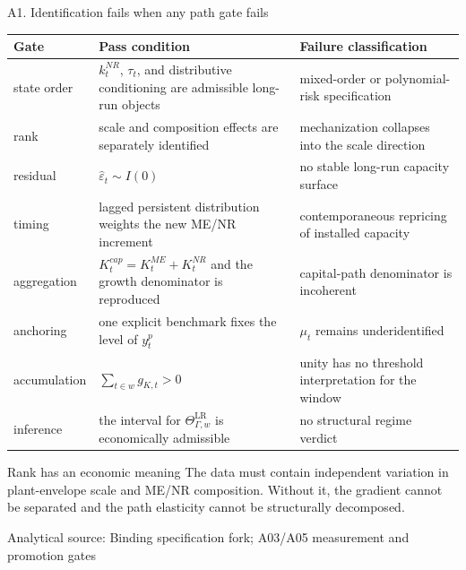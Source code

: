 \documentclass[10pt,aspectratio=169]{beamer}
\newcommand{\LR}{\mathrm{LR}}
\newcommand{\sourcefooter}[1]{%
  \par\vfill{\tiny\color{gray!70}Analytical source: #1}\vspace{-0.35em}}
\begin{document}
\begin{frame}{A1. Identification fails when any path gate fails}
  \scriptsize
  \renewcommand{\arraystretch}{1.28}
  \begin{tabular}{@{}L{0.17\textwidth}L{0.40\textwidth}L{0.35\textwidth}@{}}
    \toprule
    \textbf{Gate} & \textbf{Pass condition} & \textbf{Failure classification} \\
    \midrule
    state order & $k_t^{NR}$, $\tau_t$, and distributive conditioning are admissible long-run objects & mixed-order or polynomial-risk specification \\
    rank & scale and composition effects are separately identified & mechanization collapses into the scale direction \\
    residual & $\widehat\varepsilon_t\sim I(0)$ & no stable long-run capacity surface \\
    timing & lagged persistent distribution weights the new ME/NR increment & contemporaneous repricing of installed capacity \\
    aggregation & $K_t^{cap}=K_t^{ME}+K_t^{NR}$ and the growth denominator is reproduced & capital-path denominator is incoherent \\
    anchoring & one explicit benchmark fixes the level of $y_t^p$ & $\mu_t$ remains underidentified \\
    accumulation & $\sum_{t\in w}g_{K,t}>0$ & unity has no threshold interpretation for the window \\
    inference & the interval for $\Theta_{\Gamma,w}^{\LR}$ is economically admissible & no structural regime verdict \\
    \bottomrule
  \end{tabular}
  \vspace{0.65em}
  \begin{alertblock}{Rank has an economic meaning}
    The data must contain independent variation in plant-envelope scale and ME/NR composition. Without it, the gradient cannot be separated and the path elasticity cannot be structurally decomposed.
  \end{alertblock}
  \sourcefooter{Binding specification fork; A03/A05 measurement and promotion gates}
\end{frame}
\end{document}
